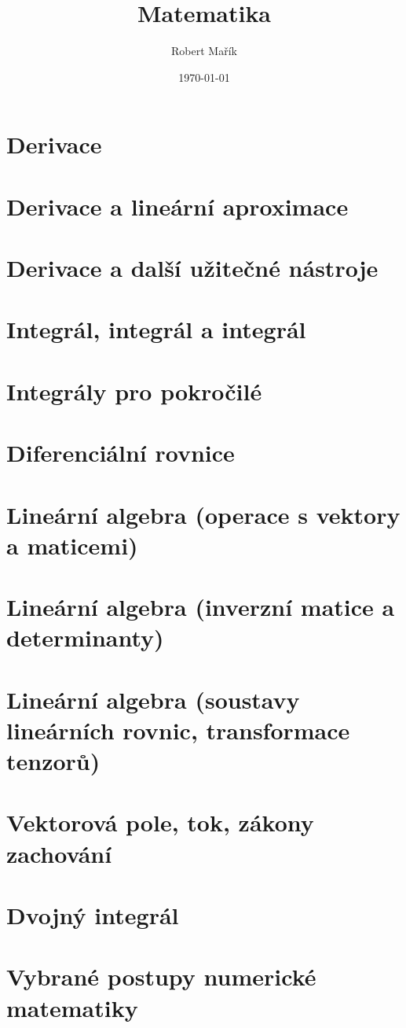 \documentclass[twocolumn]{report}
\title{Matematika}
\author{Robert Mařík}
\date{\today}
\begin{document}
\maketitle


\tableofcontents

\chapter{Derivace}


\chapter{Derivace a lineární aproximace}


\chapter{Derivace a další užitečné nástroje}


\chapter{Integrál, integrál a integrál}


\chapter{Integrály pro pokročilé}


\chapter{Diferenciální rovnice}


\chapter{Lineární algebra (operace s vektory a maticemi)}


\chapter{Lineární algebra (inverzní matice a determinanty)}


\chapter{Lineární algebra (soustavy lineárních rovnic, transformace tenzorů)}


\chapter{Vektorová pole, tok, zákony zachování}


\chapter{Dvojný integrál}


\chapter{Vybrané postupy numerické matematiky}

\end{document}
